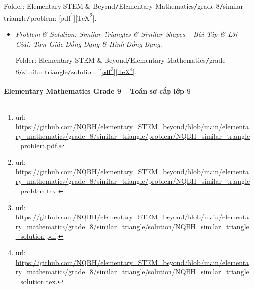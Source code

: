 \documentclass[12pt]{article}
\begin{document}
\begin{enumerate}
	Folder: {\sf Elementary STEM \& Beyond{\tt/}Elementary Mathematics{\tt/}grade 8{\tt/}similar triangle{\tt/}problem}: [\href{https://github.com/NQBH/elementary_STEM_beyond/blob/main/elementary_mathematics/grade_8/similar_triangle/problem/NQBH_similar_triangle_problem.pdf}{pdf}\footnote{{\sc url}: \url{https://github.com/NQBH/elementary_STEM_beyond/blob/main/elementary_mathematics/grade_8/similar_triangle/problem/NQBH_similar_triangle_problem.pdf}.}][\href{https://github.com/NQBH/elementary_STEM_beyond/blob/main/elementary_mathematics/grade_8/similar_triangle/problem/NQBH_similar_triangle_problem.tex}{\TeX}\footnote{{\sc url}: \url{https://github.com/NQBH/elementary_STEM_beyond/blob/main/elementary_mathematics/grade_8/similar_triangle/problem/NQBH_similar_triangle_problem.tex}.}].
	\begin{itemize}
		\item {\it Problem \& Solution: Similar Triangles \& Similar Shapes -- Bài Tập \& Lời Giải: Tam Giác Đồng Dạng \& Hình Đồng Dạng}.
		
		Folder: {\sf Elementary STEM \& Beyond{\tt/}Elementary Mathematics{\tt/}grade 8{\tt/}similar triangle{\tt/}solution}: [\href{https://github.com/NQBH/elementary_STEM_beyond/blob/main/elementary_mathematics/grade_8/similar_triangle/solution/NQBH_similar_triangle_solution.pdf}{pdf}\footnote{{\sc url}: \url{https://github.com/NQBH/elementary_STEM_beyond/blob/main/elementary_mathematics/grade_8/similar_triangle/solution/NQBH_similar_triangle_solution.pdf}.}][\href{https://github.com/NQBH/elementary_STEM_beyond/blob/main/elementary_mathematics/grade_8/similar_triangle/solution/NQBH_similar_triangle_solution.tex}{\TeX}\footnote{{\sc url}: \url{https://github.com/NQBH/elementary_STEM_beyond/blob/main/elementary_mathematics/grade_8/similar_triangle/solution/NQBH_similar_triangle_solution.tex}.}].
	\end{itemize}
\end{enumerate}

\paragraph{Elementary Mathematics Grade 9 -- Toán sơ cấp lớp 9}
\end{document}
